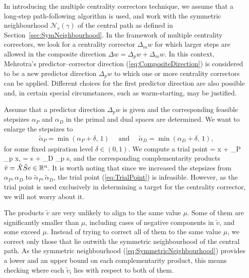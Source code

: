 In introducing the multiple centrality correctors technique,
we assume that a long-step path-following algorithm is used, 
and work with the symmetric neighbourhood $\mathcal{N}_s(\gamma)$
of the central path as defined in Section~\ref{sec:SymNeighbourhood}.
In the framework of multiple centrality correctors, we look for a 
centrality corrector $\Delta_m w$ for which larger
steps are allowed in the composite direction $\Delta w =\Delta_p w+\Delta_m w$.
In this context,
Mehrotra's predictor--corrector direction 
(\ref{eq:CompositeDirection}) is considered to be a new predictor direction
$\Delta_p w$ to which one or more centrality correctors can be applied. 
Different choices for the first predictor direction are also possible and, 
in certain special circumstances, such as warm-starting, 
may be justified.

Assume that a predictor direction $\Delta_p w$ is given 
and the corresponding
feasible stepsizes $\alpha_{P}$ and $\alpha_{D}$ 
in the primal and dual spaces are determined. 
We want to enlarge the stepsizes to 
%
\begin{eqnarray*} 
   \tilde{\alpha}_{P} = \min(\alpha_{P} \! + \! \delta, \,1) 
   \quad \mbox{ and } \quad
   \tilde{\alpha}_{D} = \min(\alpha_{D} \! + \! \delta, \,1), 
\end{eqnarray*}
%
for some fixed aspiration level $\delta \in(0,1)$. We compute a trial point
%
\be  \label{eq:TrialPoint}
   = x + \tilde{\alpha}_{P} \Delta_{p} x, \quad 
   = s + \tilde{\alpha}_{D} \Delta_{p} s,
\ee
%
and the corresponding complementarity products 
$\tilde v = \tilde X \tilde S e \in \mathbb{R}^{n}$.
It is worth noting that since we increased the stepsizes from 
$\alpha_P,\alpha_D$ to $\tilde \alpha_P,\tilde \alpha_D$,
the trial point (\ref{eq:TrialPoint}) is infeasible.
However, as the trial point is used exclusively in
determining a target for the centrality corrector, we will not
worry about it.

The products $\tilde v$ are very unlikely to align to the same value $\mu$.
Some of them are significantly smaller than $\mu$, 
including cases of negative components in $\tilde v$, 
and some exceed $\mu$. Instead of trying to correct 
all of them to the same value $\mu$, we correct only those that
lie outwith the symmetric neighbourhood of the central path.
As the symmetric neighbourhood (\ref{eq:SymmetricNeighbourhood})
provides a lower and an upper bound on each complementarity product,
this means checking where each $\tilde v_i$ lies with respect to
both of them.

